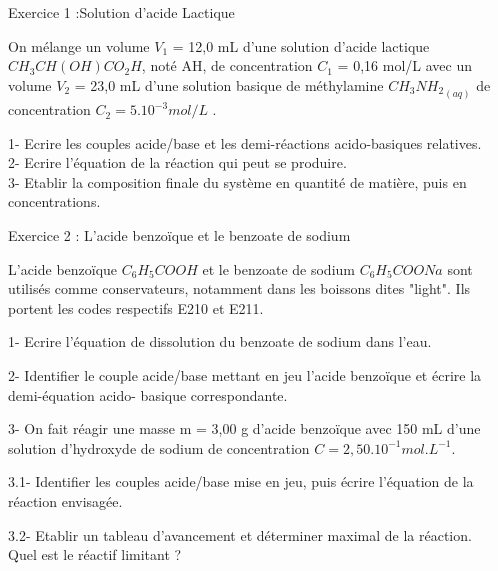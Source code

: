 \documentclass[12pt, french]{article}
\begin{document}
\begin{center}
\end{center}


   \begin{Box2}{Exercice 1 :Solution d’acide Lactique } 

  On mélange un volume $V_1$ = 12,0 mL d’une solution d’acide lactique $CH_3CH(OH)CO_2H$, noté AH, de
concentration $C_1$ = 0,16 mol/L avec un volume $V_2$ = 23,0 mL d’une solution basique de méthylamine ${CH_3NH_2}_{(aq)}$ de concentration $C_2 = 5.10^{-3} mol/L$ .

1- Ecrire les couples acide/base et les demi-réactions acido-basiques relatives.
\\2- Ecrire l’équation de la réaction qui peut se produire.
\\3- Etablir la composition finale du système en quantité de matière, puis en concentrations.
   \end{Box2}

\begin{Box2}{Exercice 2 : L’acide benzoïque et le benzoate de sodium }

   L’acide benzoïque $C_6H_5COOH$ et le benzoate de sodium $C_6H_5COONa$ sont utilisés comme conservateurs, notamment dans les boissons dites  "light". Ils portent les codes respectifs E210 et
E211.

1- Ecrire l’équation de dissolution du benzoate de sodium dans l’eau.

2- Identifier le couple acide/base mettant en jeu l’acide benzoïque et écrire la demi-équation acido-
basique correspondante.

   3- On fait réagir une masse m = 3,00 g d’acide benzoïque avec 150 mL d’une solution d’hydroxyde de sodium de concentration $C = 2,50.10^{-1}mol.L^{-1}.$

3.1- Identifier les couples acide/base mise en jeu, puis écrire l’équation de la réaction envisagée.

3.2- Etablir un tableau d’avancement et déterminer maximal de la réaction. 
  \\ Quel est le réactif limitant ?
\end{Box2}
\end{document}
